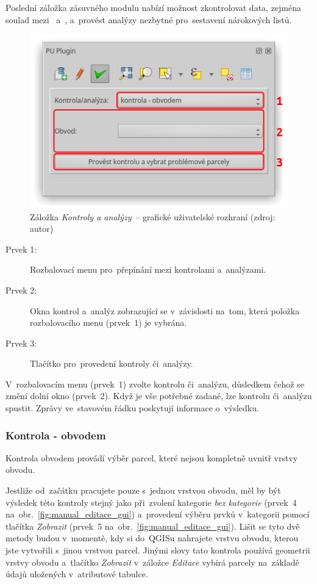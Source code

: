 Poslední záložka zásuvného modulu nabízí možnost zkontrolovat data,
zejména soulad mezi~ a~, a~provést analýzy nezbytné
pro~sestavení nárokových listů.

	\begin{figure}[H] \centering
		\includegraphics[width=.55\textwidth]{./pictures/ca_gui.png}
		\caption[Záložka \textit{Kontroly a analýzy}~–
grafické uživatelské rozhraní]{Záložka \textit{Kontroly a analýzy}~–
grafické uživatelské rozhraní (zdroj: autor)}
		\label{fig:manual_ca_gui}
 	\end{figure}

\begin{description}
	\item[Prvek 1:] Rozbalovací menu pro~přepínání mezi kontrolami
a~analýzami.
	\item[Prvek 2:] Okna kontrol a~analýz zobrazující se
v~závislosti na~tom, která položka rozbalovacího menu (prvek~1) je
vybrána.
	\item[Prvek 3:] Tlačítko pro~provedení kontroly či~analýzy.
\end{description}

V~rozbalovacím menu (prvek~1) zvolte kontrolu či~analýzu, důsledkem
čehož se změní dolní okno (prvek~2). Když je vše potřebné zadané, lze
kontrolu či~analýzu spustit. Zprávy ve~stavovém řádku poskytují
informace o~výsledku.

\subsubsection{Kontrola - obvodem}
\label{manual_kontrola_obvodem}

Kontrola obvodem provádí výběr parcel, které nejsou kompletně uvnitř
vrstvy obvodu.

Jestliže od~začátku pracujete pouze s~jednou vrstvou obvodu, měl by
být výsledek této kontroly stejný jako při~zvolení kategorie
\textit{bez kategorie} (prvek~4 na~obr.~\ref{fig:manual_editace_gui})
a~provedení výběru prvků v~kategorii pomocí tlačítka \textit{Zobrazit}
(prvek~5 na~obr.~\ref{fig:manual_editace_gui}). Lišit se tyto dvě
metody budou v~momentě, kdy si do~QGISu nahrajete vrstvu obvodu,
kterou jste vytvořili s~jinou vrstvou parcel. Jinými slovy tato
kontrola používá geometrii vrstvy obvodu a~tlačítko \textit{Zobrazit}
v~záložce \textit{Editace} vybírá parcely na~základě údajů uložených
v~atributové tabulce.

